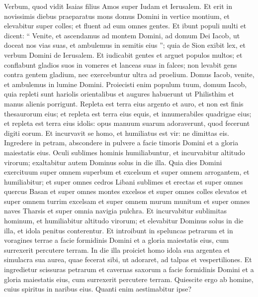 \begin{biblechapter}
\begin{biblechapter}
\verse Verbum, quod vidit Isaias filius Amos super Iudam et Ierusalem.
 \verse Et erit in novissimis diebus
 praeparatus mons domus Domini in vertice montium,
 et elevabitur super colles;
 et fluent ad eum omnes gentes.
 \verse Et ibunt populi multi et dicent:
 “ Venite, et ascendamus ad montem Domini,
 ad domum Dei Iacob,
 ut doceat nos vias suas,
 et ambulemus in semitis eius ”;
 quia de Sion exibit lex,
 et verbum Domini de Ierusalem.
 \verse Et iudicabit gentes
 et arguet populos multos;
 et conflabunt gladios suos in vomeres
 et lanceas suas in falces;
 non levabit gens contra gentem gladium,
 nec exercebuntur ultra ad proelium.
 \verse Domus Iacob, venite,
 et ambulemus in lumine Domini.
 \verse Proiecisti enim populum tuum, domum Iacob,
 quia repleti sunt hariolis orientalibus
 et augures habuerunt ut Philisthim
 et manus alienis porrigunt.
 \verse Repleta est terra eius argento et auro,
 et non est finis thesaurorum eius;
 \verse et repleta est terra eius equis,
 et innumerabiles quadrigae eius;
 et repleta est terra eius idolis:
 opus manuum suarum adoraverunt,
 quod fecerunt digiti eorum.
 \verse Et incurvavit se homo,
 et humiliatus est vir:
 ne dimittas eis.
 \verse Ingredere in petram, abscondere in pulvere
 a facie timoris Domini et a gloria maiestatis eius.
 \verse Oculi sublimes hominis humiliabuntur,
 et incurvabitur altitudo virorum;
 exaltabitur autem Dominus solus in die illa.
 \verse Quia dies Domini exercituum
 super omnem superbum et excelsum
 et super omnem arrogantem, et humiliabitur;
 \verse et super omnes cedros Libani sublimes et erectas
 et super omnes quercus Basan
 \verse et super omnes montes excelsos
 et super omnes colles elevatos
 \verse et super omnem turrim excelsam
 et super omnem murum munitum
 \verse et super omnes naves Tharsis
 et super omnia navigia pulchra.
 \verse Et incurvabitur sublimitas hominum,
 et humiliabitur altitudo virorum;
 et elevabitur Dominus solus in die illa,
 \verse et idola penitus conterentur.
 \verse Et introibunt in speluncas petrarum
 et in voragines terrae
 a facie formidinis Domini et a gloria maiestatis eius,
 cum surrexerit percutere terram.
 \verse In die illa proiciet homo idola sua argentea et simulacra sua aurea, quae fecerat sibi, ut adoraret, ad talpas et vespertiliones. 
\verse Et ingredietur scissuras petrarum et cavernas saxorum a facie formidinis Domini et a gloria maiestatis eius, cum surrexerit percutere terram. 
\verse Quiescite ergo ab homine, cuius spiritus in naribus eius. Quanti enim aestimabitur ipse?
 

\end{biblechapter}
\end{biblechapter}
